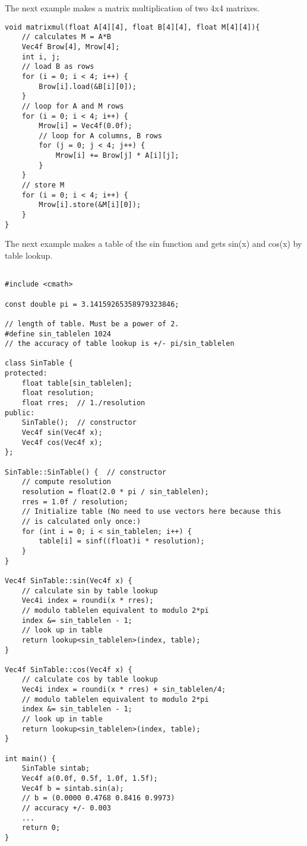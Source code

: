 \documentclass[vcl_manual.tex]{subfiles}
\begin{document}
The next example makes a matrix multiplication of two 4x4 matrixes.

\begin{example}
\label{exampleMatrixMul4x4}
\end{example}
\begin{lstlisting}[frame=single]
void matrixmul(float A[4][4], float B[4][4], float M[4][4]){
    // calculates M = A*B
    Vec4f Brow[4], Mrow[4];
    int i, j;
    // load B as rows
    for (i = 0; i < 4; i++) {
        Brow[i].load(&B[i][0]);
    }
    // loop for A and M rows
    for (i = 0; i < 4; i++) {
        Mrow[i] = Vec4f(0.0f);
        // loop for A columns, B rows
        for (j = 0; j < 4; j++) {
            Mrow[i] += Brow[j] * A[i][j];
        }
    }
    // store M
    for (i = 0; i < 4; i++) {
        Mrow[i].store(&M[i][0]);
    }
}
\end{lstlisting}


The next example makes a table of the sin function and gets sin(x) and cos(x) by table lookup.

\begin{example}
\label{exampleSinTable}
\end{example}
\begin{lstlisting}[frame=single]

#include <cmath>

const double pi = 3.14159265358979323846;

// length of table. Must be a power of 2.
#define sin_tablelen 1024
// the accuracy of table lookup is +/- pi/sin_tablelen

class SinTable {
protected:
    float table[sin_tablelen];
    float resolution;
    float rres;  // 1./resolution
public:
    SinTable();  // constructor
    Vec4f sin(Vec4f x);
    Vec4f cos(Vec4f x);
};

SinTable::SinTable() {  // constructor
    // compute resolution
    resolution = float(2.0 * pi / sin_tablelen);
    rres = 1.0f / resolution;
    // Initialize table (No need to use vectors here because this 
    // is calculated only once:)
    for (int i = 0; i < sin_tablelen; i++) {
        table[i] = sinf((float)i * resolution);
    }
}

Vec4f SinTable::sin(Vec4f x) {
    // calculate sin by table lookup
    Vec4i index = roundi(x * rres);
    // modulo tablelen equivalent to modulo 2*pi
    index &= sin_tablelen - 1;
    // look up in table
    return lookup<sin_tablelen>(index, table);
}

Vec4f SinTable::cos(Vec4f x) {
    // calculate cos by table lookup
    Vec4i index = roundi(x * rres) + sin_tablelen/4;
    // modulo tablelen equivalent to modulo 2*pi
    index &= sin_tablelen - 1;
    // look up in table
    return lookup<sin_tablelen>(index, table);
}

int main() {
    SinTable sintab;
    Vec4f a(0.0f, 0.5f, 1.0f, 1.5f);
    Vec4f b = sintab.sin(a);
    // b = (0.0000 0.4768 0.8416 0.9973)
    // accuracy +/- 0.003
    ...
    return 0;
}
\end{lstlisting}
\end{document}
